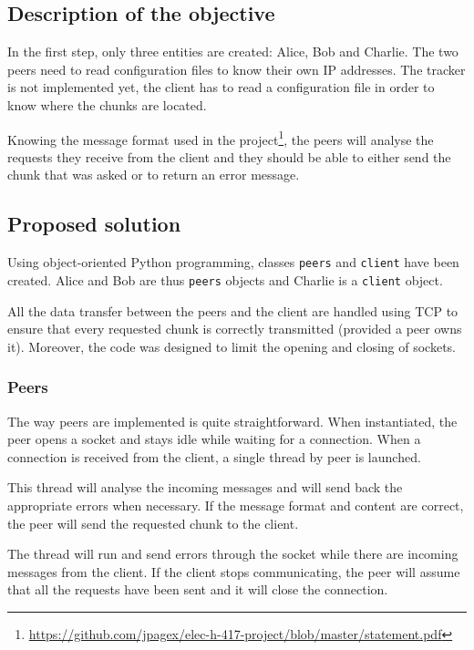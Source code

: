 \subsection{Description of the objective}

In the first step, only three entities are created: Alice, Bob and Charlie. The two peers need to read configuration files to know their own IP addresses. The tracker is not implemented yet, the client has to read a configuration file in order to know where the chunks are located.

Knowing the message format used in the project\footnote{\url{https://github.com/jpagex/elec-h-417-project/blob/master/statement.pdf}}, the peers will analyse the requests they receive from the client and they should be able to either send the chunk that was asked or to return an error message.

\subsection{Proposed solution}

Using object-oriented Python programming, classes \texttt{peers} and \texttt{client} have been created. Alice and Bob are thus \texttt{peers} objects and Charlie is a \texttt{client} object.

All the data transfer between the peers and the client are handled using TCP to ensure that every requested chunk is correctly transmitted (provided a peer owns it). Moreover, the code was designed to limit the opening and closing of sockets.

\subsubsection{Peers}

The way peers are implemented is quite straightforward. When instantiated, the peer opens a socket and stays idle while waiting for a connection. When a connection is received from the client, a single thread by peer is launched.

This thread will analyse the incoming messages and will send back the appropriate errors when necessary. If the message format and content are correct, the peer will send the requested chunk to the client.

The thread will run and send errors through the socket while there are incoming messages from the client. If the client stops communicating, the peer will assume that all the requests have been sent and it will close the connection.

